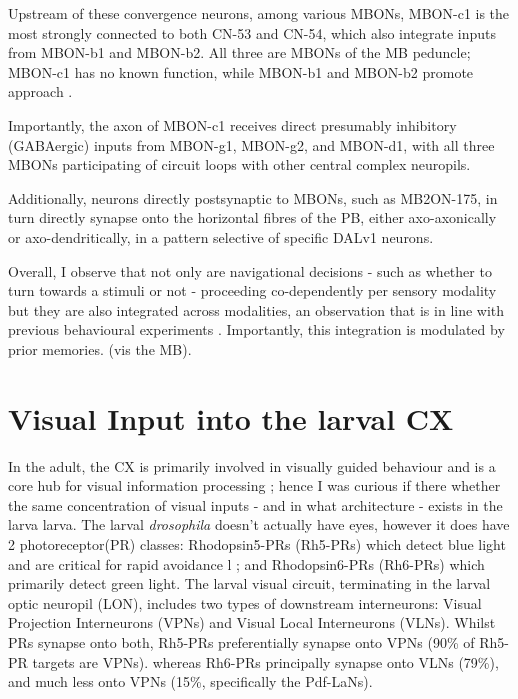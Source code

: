     Upstream of these convergence neurons, among various MBONs, MBON-c1 is the most strongly connected to both CN-53 and CN-54, which also integrate inputs from MBON-b1 and MBON-b2. All three are MBONs of the MB peduncle; MBON-c1 has no known function, while MBON-b1 and MBON-b2 promote approach \citep{eschbach2021circuits}.

   Importantly, the axon of MBON-c1 receives direct presumably inhibitory (GABAergic) inputs from MBON-g1, MBON-g2, and MBON-d1, with all three MBONs participating of circuit loops with other central complex neuropils.

    Additionally, neurons directly postsynaptic to MBONs, such as MB2ON-175, in turn directly synapse onto the horizontal fibres of the PB, either axo-axonically or axo-dendritically, in a pattern selective of specific DALv1 neurons.

    Overall, I observe that not only are navigational decisions - such as whether to turn towards a stimuli or not - proceeding co-dependently per sensory modality but they are also integrated across modalities, an observation that is in line with previous behavioural experiments \citep{gepner2015computations}. Importantly, this integration is modulated by prior memories. (vis the MB). 

\section{Visual Input into the larval CX}
\label{CXvisual}  
    In the adult, the CX is primarily involved in visually guided behaviour and is a core hub for visual information processing \citep{omoto2017visual, hulse2021connectome}; hence I was curious  if there whether the same concentration of visual inputs - and in what architecture - exists in the larva larva.
    The larval \textit{drosophila} doesn't actually have eyes, however it does have 2  photoreceptor(PR) classes:  Rhodopsin5-PRs (Rh5-PRs) which detect blue light and are critical for rapid avoidance l \citep{keene2011distinct}; and Rhodopsin6-PRs (Rh6-PRs) which primarily detect green light. 
    The larval visual circuit, terminating in the larval optic neuropil (LON), includes two types of downstream interneurons:  Visual Projection Interneurons (VPNs) and Visual Local Interneurons (VLNs). Whilst PRs synapse onto both, Rh5-PRs preferentially synapse onto VPNs (90\% of Rh5-PR targets are VPNs).
    whereas Rh6-PRs principally synapse onto VLNs (79\%), and much less onto VPNs (15\%, specifically the Pdf-LaNs). 

